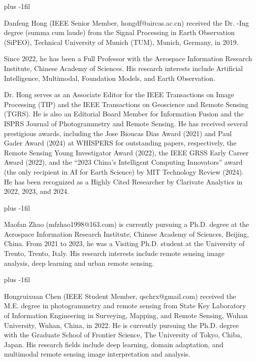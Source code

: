 \documentclass[journal]{IEEEtran}
\begin{document}
\baselineskip plus -1fil

\begin{IEEEbiographynophoto}
    {Danfeng Hong} (IEEE Senior Member, hongdf@aircas.ac.cn) received the Dr. -Ing degree (summa cum laude) from the Signal Processing in Earth Observation (SiPEO), Technical University of Munich (TUM), Munich, Germany, in 2019. 

    Since 2022, he has been a Full Professor with the Aerospace Information Research Institute, Chinese Academy of Sciences. His research interests include Artificial Intelligence, Multimodal, Foundation Models, and Earth Observation. 
    
    Dr. Hong serves as an Associate Editor for the IEEE Transactions on Image Processing (TIP) and the IEEE Transactions on Geoscience and Remote Sensing (TGRS). He is also an Editorial Board Member for Information Fusion and the ISPRS Journal of Photogrammetry and Remote Sensing. He has received several prestigious awards, including the Jose Bioucas Dias Award (2021) and Paul Gader Award (2024) at WHISPERS for outstanding papers, respectively, the Remote Sensing Young Investigator Award (2022), the IEEE GRSS Early Career Award (2022), and the ``2023 China’s Intelligent Computing Innovators'' award (the only recipient in AI for Earth Science) by MIT Technology Review (2024). He has been recognized as a Highly Cited Researcher by Clarivate Analytics in 2022, 2023, and 2024.
\end{IEEEbiographynophoto}

\baselineskip plus -1fil

\begin{IEEEbiographynophoto}
    {Maofan Zhao} (mfzhao1998@163.com) is currently pursuing a Ph.D. degree at the Aerospace Information Research Institute, Chinese Academy of Sciences, Beijing, China. From 2021 to 2023, he was a Visiting Ph.D. student at the University of Trento, Trento, Italy. His research interests include remote sensing image analysis, deep learning and urban remote sensing.
\end{IEEEbiographynophoto}

\baselineskip plus -1fil

\begin{IEEEbiographynophoto}
    {Hongruixuan Chen} (IEEE Student Member, qschrx@gmail.com) received the M.E. degree in photogrammetry and remote sensing from State Key Laboratory of Information Engineering in Surveying, Mapping, and Remote Sensing, Wuhan University, Wuhan, China, in 2022. He is currently pursuing the Ph.D. degree with the Graduate School of Frontier Science, The University of Tokyo, Chiba, Japan. His research fields include deep learning, domain adaptation, and multimodal remote sensing image interpretation and analysis.
\end{IEEEbiographynophoto}
\end{document}
